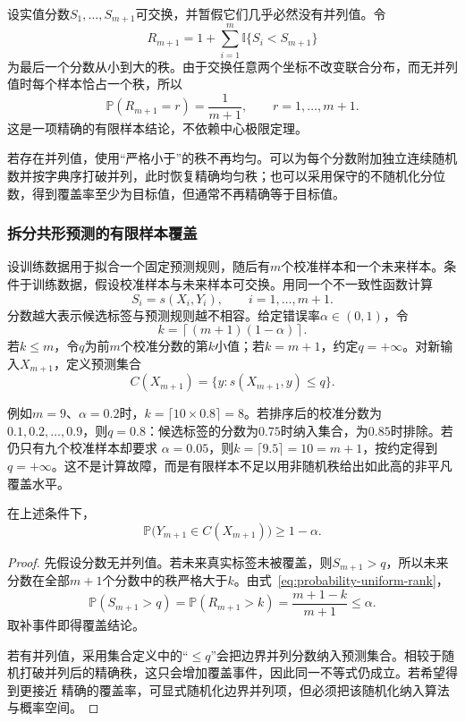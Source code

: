 设实值分数\(S_1,\ldots,S_{m+1}\)可交换，并暂假它们几乎必然没有并列值。令
\[ R_{m+1}
  =1+\sum_{i=1}^{m}\mathbb{I}\{S_i<S_{m+1}\} \]
为最后一个分数从小到大的秩。由于交换任意两个坐标不改变联合分布，而无并列值时每个样本恰占一个秩，所以
\begin{equation}
  \mathbb{P}(R_{m+1}=r)=\frac{1}{m+1},
  \qquad r=1,\ldots,m+1.
  \label{eq:probability-uniform-rank}
\end{equation}
这是一项精确的有限样本结论，不依赖中心极限定理。

若存在并列值，使用“严格小于”的秩不再均匀。可以为每个分数附加独立连续随机数并按字典序打破并列，此时恢复精确均匀秩；也可以采用保守的不随机化分位数，得到覆盖率至少为目标值，但通常不再精确等于目标值。

\subsubsection{拆分共形预测的有限样本覆盖}

设训练数据用于拟合一个固定预测规则，随后有\(m\)个校准样本和一个未来样本。条件于训练数据，假设校准样本与未来样本可交换。用同一个不一致性函数计算
\[ S_i=s(X_i,Y_i),
  \qquad i=1,\ldots,m+1. \]
分数越大表示候选标签与预测规则越不相容。给定错误率\(\alpha\in(0,1)\)，令
\[ k=\left\lceil(m+1)(1-\alpha)\right\rceil. \]
若\(k\leq m\)，令\(q\)为前\(m\)个校准分数的第\(k\)小值；若\(k=m+1\)，约定\(q=+\infty\)。对新输入\(X_{m+1}\)，定义预测集合
\begin{equation}
  C(X_{m+1})
  =
  \{y:s(X_{m+1},y)\leq q\}.
  \label{eq:probability-split-conformal-set}
\end{equation}

例如\(m=9\)、\(\alpha=0.2\)时，\(k=\lceil10\times0.8\rceil=8\)。若排序后的校准分数为
\(0.1,0.2,\ldots,0.9\)，则\(q=0.8\)：候选标签的分数为\(0.75\)时纳入集合，为\(0.85\)时排除。若仍只有九个校准样本却要求
\(\alpha=0.05\)，则\(k=\lceil9.5\rceil=10=m+1\)，按约定得到\(q=+\infty\)。这不是计算故障，而是有限样本不足以用非随机秩给出如此高的非平凡覆盖水平。

\begin{theorem}[拆分共形的有限样本覆盖]
\label{thm:probability-split-conformal-coverage}
在上述条件下，
\[ \mathbb{P}\bigl(
    Y_{m+1}\in C(X_{m+1})\bigr)\geq 1-\alpha. \]
\end{theorem}

\begin{proof}
先假设分数无并列值。若未来真实标签未被覆盖，则\(S_{m+1}>q\)，所以未来分数在全部\(m+1\)个分数中的秩严格大于\(k\)。由式~\eqref{eq:probability-uniform-rank}，
\[ \mathbb{P}(S_{m+1}>q)
  =\mathbb{P}(R_{m+1}>k)=\frac{m+1-k}{m+1}\leq\alpha. \]
取补事件即得覆盖结论。

若有并列值，采用集合定义中的“\(\leq q\)”会把边界并列分数纳入预测集合。相较于随机打破并列后的精确秩，这只会增加覆盖事件，因此同一不等式仍成立。若希望得到更接近
精确的覆盖率，可显式随机化边界并列项，但必须把该随机化纳入算法与概率空间。
\end{proof}

